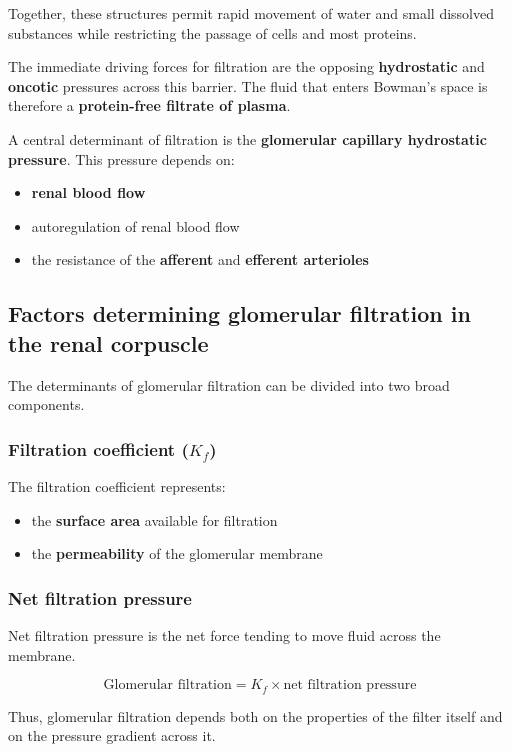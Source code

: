 \documentclass[11pt,a4paper]{article}
\begin{document}
Together, these structures permit rapid movement of water and small dissolved substances while restricting the passage of cells and most proteins.

The immediate driving forces for filtration are the opposing \textbf{hydrostatic} and \textbf{oncotic} pressures across this barrier. The fluid that enters Bowman’s space is therefore a \textbf{protein-free filtrate of plasma}.

A central determinant of filtration is the \textbf{glomerular capillary hydrostatic pressure}. This pressure depends on:
\begin{itemize}
    \item \textbf{renal blood flow}
    \item autoregulation of renal blood flow
    \item the resistance of the \textbf{afferent} and \textbf{efferent arterioles}
\end{itemize}

\subsection{Factors determining glomerular filtration in the renal corpuscle}

The determinants of glomerular filtration can be divided into two broad components.

\subsubsection{Filtration coefficient (\texorpdfstring{$K_f$}{Kf})}

The filtration coefficient represents:
\begin{itemize}
    \item the \textbf{surface area} available for filtration
    \item the \textbf{permeability} of the glomerular membrane
\end{itemize}

\subsubsection{Net filtration pressure}

Net filtration pressure is the net force tending to move fluid across the membrane.

\[
\text{Glomerular filtration} = K_f \times \text{net filtration pressure}
\]

Thus, glomerular filtration depends both on the properties of the filter itself and on the pressure gradient across it.
\end{document}
